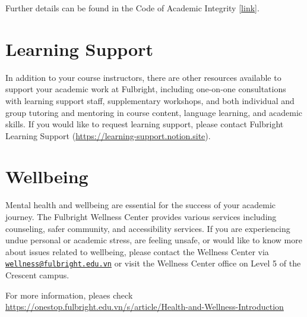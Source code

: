 \documentclass[
  openany]{book}
\begin{document}
Further details can be found in the Code of Academic Integrity {[}\href{https://fulbright.edu.vn/articles/Code\%20of\%20Academic\%20Integrity/Code\%20of\%20Academic\%20Integrity_\%20Excom\%20Endorsed.pdf}{link}{]}.

\section*{Learning Support}\label{learning-support}

In addition to your course instructors, there are other resources available to support your
academic work at Fulbright, including one-on-one consultations with learning support staff,
supplementary workshops, and both individual and group tutoring and mentoring in course
content, language learning, and academic skills. If you would like to request learning support,
please contact Fulbright Learning Support (\url{https://learning-support.notion.site}).

\section*{Wellbeing}\label{wellbeing}

Mental health and wellbeing are essential for the success of your academic journey. The
Fulbright Wellness Center provides various services including counseling, safer community,
and accessibility services. If you are experiencing undue personal or academic stress, are
feeling unsafe, or would like to know more about issues related to wellbeing, please contact
the Wellness Center via \href{mailto:wellness@fulbright.edu.vn}{\nolinkurl{wellness@fulbright.edu.vn}} or visit the Wellness Center office on
Level 5 of the Crescent campus.

For more information, pleaes check
\url{https://onestop.fulbright.edu.vn/s/article/Health-and-Wellness-Introduction}
\end{document}
